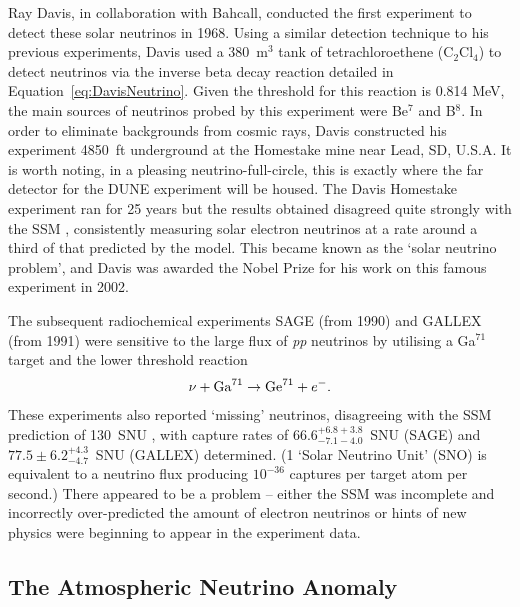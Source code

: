 Ray Davis, in collaboration with Bahcall, conducted the first experiment to detect these solar neutrinos in 1968.  Using a similar detection technique to his previous experiments, Davis used a 380~m$^3$ tank of tetrachloroethene (C$_2$Cl$_4$) to detect neutrinos via the inverse beta decay reaction detailed in Equation~\ref{eq:DavisNeutrino}.  Given the threshold for this reaction is 0.814 MeV, the main sources of neutrinos probed by this experiment were Be$^7$ and B$^8$.  In order to eliminate backgrounds from cosmic rays, Davis constructed his experiment 4850~ft underground at the Homestake mine near Lead, SD, U.S.A.  It is worth noting, in a pleasing neutrino-full-circle, this is exactly where the far detector for the DUNE experiment will be housed.  The Davis Homestake experiment ran for 25 years but the results obtained \cite{Cleveland1995} disagreed quite strongly with the SSM \cite{Bahcall1995}, consistently measuring solar electron neutrinos at a rate around a third of that predicted by the model.  This became known as the `solar neutrino problem', and Davis was awarded the Nobel Prize for his work on this famous experiment in 2002.

The subsequent radiochemical experiments SAGE (from 1990) and GALLEX (from 1991) were sensitive to the large flux of \textit{pp} neutrinos by utilising a Ga$^{71}$ target and the lower threshold reaction
\begin{equation}
\nu + \textnormal{Ga}^{71} \rightarrow \textnormal{Ge}^{71} + e^-.
\end{equation}
These experiments also reported `missing' neutrinos, disagreeing with the SSM prediction of 130~SNU \cite{Hampel1999}, with capture rates of $66.6^{+6.8+3.8}_{-7.1-4.0}$~SNU (SAGE) \cite{Abdurashitov1994} and $77.5\pm6.2^{+4.3}_{-4.7}$~SNU (GALLEX) \cite{Anselmann1992} determined.  (1 `Solar Neutrino Unit' (SNO) is equivalent to a neutrino flux producing $10^{-36}$ captures per target atom per second.)  There appeared to be a problem -- either the SSM was incomplete and incorrectly over-predicted the amount of electron neutrinos or hints of new physics were beginning to appear in the experiment data.

\subsection{The Atmospheric Neutrino Anomaly}\label{sec:AtmosphericNeutrinoAnomaly}


